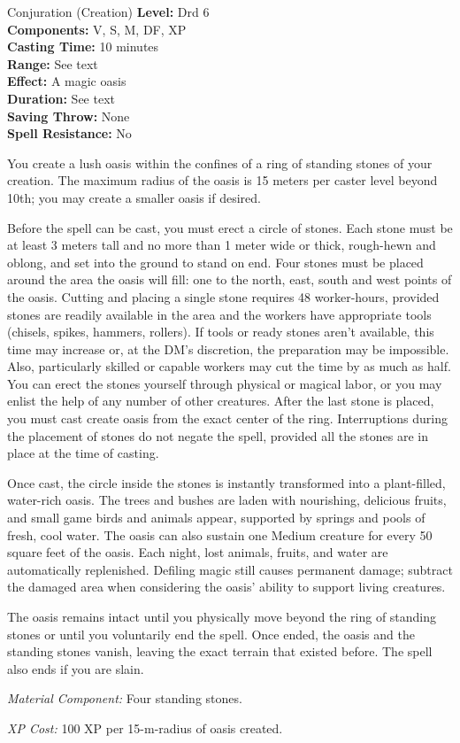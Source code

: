 {Conjuration (Creation)}
{
	\textbf{Level:}
	Drd 6\\
	\textbf{Components:}
	V, S, M, DF, XP\\
	\textbf{Casting Time:}
	10 minutes\\
	\textbf{Range:}
	See text\\
	\textbf{Effect:}
	A magic oasis\\
	\textbf{Duration:}
	See text\\
	\textbf{Saving Throw:}
	None\\
	\textbf{Spell Resistance:}
	No\\
}
{
	You create a lush oasis within the confines of a ring of standing stones of your creation. The maximum radius of the oasis is 15 meters per caster level beyond 10th; you may create a smaller oasis if desired.

	Before the spell can be cast, you must erect a circle of stones. Each stone must be at least 3 meters tall and no more than 1 meter wide or thick, rough-hewn and oblong, and set into the ground to stand on end. Four stones must be placed around the area the oasis will fill: one to the north, east, south and west points of the oasis. Cutting and placing a single stone requires 48 worker-hours, provided stones are readily available in the area and the workers have appropriate tools (chisels, spikes, hammers, rollers). If tools or ready stones aren't available, this time may increase or, at the DM's discretion, the preparation may be impossible. Also, particularly skilled or capable workers may cut the time by as much as half. You can erect the stones yourself through physical or magical labor, or you may enlist the help of any number of other creatures. After the last stone is placed, you must cast create oasis from the exact center of the ring. Interruptions during the placement of stones do not negate the spell, provided all the stones are in place at the time of casting.

	Once cast, the circle inside the stones is instantly transformed into a plant-filled, water-rich oasis. The trees and bushes are laden with nourishing, delicious fruits, and small game birds and animals appear, supported by springs and pools of fresh, cool water. The oasis can also sustain one Medium creature for every 50 square feet of the oasis. Each night, lost animals, fruits, and water are automatically replenished. Defiling magic still causes permanent damage; subtract the damaged area when considering the oasis' ability to support living creatures.

	The oasis remains intact until you physically move beyond the ring of standing stones or until you voluntarily end the spell. Once ended, the oasis and the standing stones vanish, leaving the exact terrain that existed before. The spell also ends if you are slain.

	\textit{Material Component:} Four standing stones.

	\textit{XP Cost:} 100 XP per 15-m-radius of oasis created.
}
